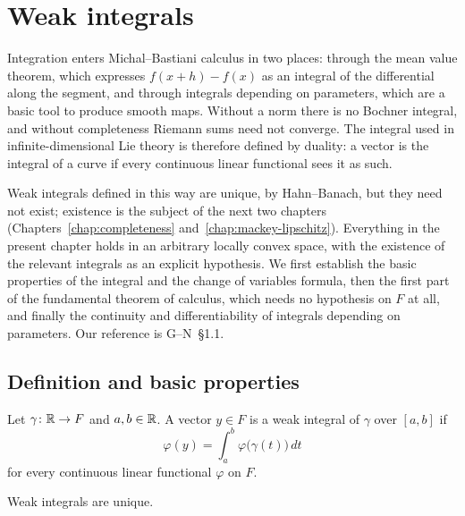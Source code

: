 \chapter{Weak integrals}
\label{chap:integrals}

Integration enters Michal--Bastiani calculus in two places: through the mean value theorem,
which expresses $f(x + h) - f(x)$ as an integral of the differential along the segment, and
through integrals depending on parameters, which are a basic tool to produce smooth maps.
Without a norm there is no Bochner integral, and without completeness Riemann
sums need not converge. The integral used in infinite-dimensional Lie theory is therefore
defined by duality: a vector is the integral of a curve if every continuous linear functional
sees it as such.

Weak integrals defined in this way are unique, by Hahn--Banach, but they need not exist;
existence is the subject of the next two chapters (Chapters~\ref{chap:completeness}
and~\ref{chap:mackey-lipschitz}). Everything in the present chapter holds in an arbitrary
locally convex space, with the existence of the relevant integrals as an explicit hypothesis.
We first establish the basic properties of the integral and the change of variables formula,
then the first part of the fundamental theorem of calculus, which needs no hypothesis on $F$
at all, and finally the continuity and differentiability of integrals depending on parameters.
Our reference is G--N~\S1.1.

\section{Definition and basic properties}

\begin{definition}
  \label{def:weak-integral}
  \leanok
  Let $\gamma \colon \mathbb{R} \to F$ and $a, b \in \mathbb{R}$. A vector $y \in F$ is a weak integral of
  $\gamma$ over $[a, b]$ if
  \[
    \varphi(y) = \int_a^b \varphi\bigl(\gamma(t)\bigr)\, dt
  \]
  for every continuous linear functional $\varphi$ on $F$.
\end{definition}

\begin{lemma}[Uniqueness]
  \label{lem:weak-integral-unique}
  \leanok
  Weak integrals are unique.
\end{lemma}

